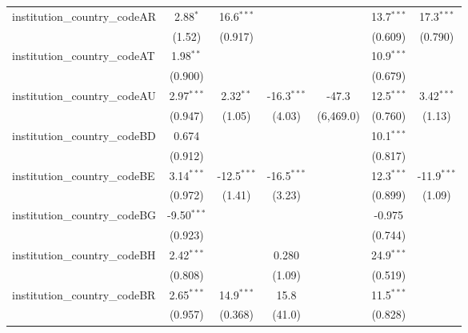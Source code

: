 \begin{tabular}{lcccccc}
   institution\_country\_codeAR          & 2.88$^{*}$     & 16.6$^{***}$  &               &            & 13.7$^{***}$  & 17.3$^{***}$\\   
                                         & (1.52)         & (0.917)       &               &            & (0.609)       & (0.790)\\   
   institution\_country\_codeAT          & 1.98$^{**}$    &               &               &            & 10.9$^{***}$  &   \\   
                                         & (0.900)        &               &               &            & (0.679)       &   \\   
   institution\_country\_codeAU          & 2.97$^{***}$   & 2.32$^{**}$   & -16.3$^{***}$ & -47.3      & 12.5$^{***}$  & 3.42$^{***}$\\   
                                         & (0.947)        & (1.05)        & (4.03)        & (6,469.0)  & (0.760)       & (1.13)\\   
   institution\_country\_codeBD          & 0.674          &               &               &            & 10.1$^{***}$  &   \\   
                                         & (0.912)        &               &               &            & (0.817)       &   \\   
   institution\_country\_codeBE          & 3.14$^{***}$   & -12.5$^{***}$ & -16.5$^{***}$ &            & 12.3$^{***}$  & -11.9$^{***}$\\   
                                         & (0.972)        & (1.41)        & (3.23)        &            & (0.899)       & (1.09)\\   
   institution\_country\_codeBG          & -9.50$^{***}$  &               &               &            & -0.975        &   \\   
                                         & (0.923)        &               &               &            & (0.744)       &   \\   
   institution\_country\_codeBH          & 2.42$^{***}$   &               & 0.280         &            & 24.9$^{***}$  &   \\   
                                         & (0.808)        &               & (1.09)        &            & (0.519)       &   \\   
   institution\_country\_codeBR          & 2.65$^{***}$   & 14.9$^{***}$  & 15.8          &            & 11.5$^{***}$  &   \\   
                                         & (0.957)        & (0.368)       & (41.0)        &            & (0.828)       &   \\   

\end{tabular}
